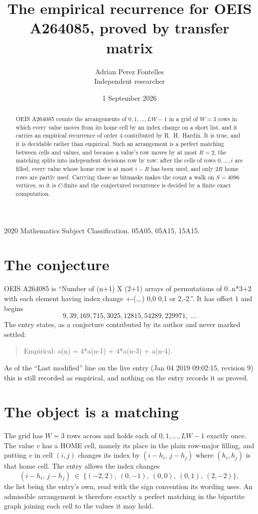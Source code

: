 \documentclass[11pt,a4paper]{article}
\title{The empirical recurrence for OEIS A264085, proved by transfer matrix}
\author{Adrian Perez Fontelles\\ \small Independent researcher}
\date{1 September 2026}
\theoremstyle{plain}
\theoremstyle{definition}
\begin{document}
\maketitle

\begin{abstract}
OEIS A264085 counts the arrangements of $0,1,\dots,LW-1$ in a grid of $W=3$ rows in which
every value moves from its home cell by an index change on a short list, and it carries an
empirical recurrence of order $4$ contributed by R.~H.~Hardin. It is true, and it is
decidable rather than empirical. Such an arrangement is a perfect matching between cells and
values, and because a value's row moves by at most $R=2$, the matching splits into
independent decisions row by row: after the cells of rows $0,\dots,i$ are filled,
every value whose home row is at most $i-R$ has been used, and only $2R$ home rows are
partly used. Carrying those as bitmasks makes the count a walk on $S=4096$ vertices, so it is
$C$-finite and the conjectured recurrence is decided by a finite exact computation.
\end{abstract}

\noindent\small 2020 Mathematics Subject Classification. 05A05, 05A15, 15A15.\normalsize

\section{The conjecture}

OEIS A264085 is ``Number of (n+1) X (2+1) arrays of permutations of 0..n*3+2 with each element having index change +-(.,.) 0,0 0,1 or 2,-2.''. It has offset $1$ and begins
\[
9, 39, 169, 715, 3025, 12815, 54289, 229971,\ \dots
\]
The entry states, as a conjecture contributed by its author and never marked settled:
\begin{quote}
Empirical: a(n) = 4*a(n-1) + 4*a(n-3) + a(n-4).
\end{quote}
As of the ``Last modified'' line on the live entry (Jan 04 2019 09:02:15, revision 9) this is still
recorded as empirical, and nothing on the entry records it as proved.

\section{The object is a matching}

The grid has $W=3$ rows across and holds each of $0,1,\dots,LW-1$ exactly once. The value
$v$ has a HOME cell, namely its place in the plain row-major filling, and putting $v$ in cell
$(i,j)$ changes its index by $(i-h_i,\,j-h_j)$ where $(h_i,h_j)$ is that home cell. The entry
allows the index changes
\[
(i-h_i,\,j-h_j)\;\in\;\{(-2,2),\ (0,-1),\ (0,0),\ (0,1),\ (2,-2)\},
\]
the list being the entry's own, read with the sign convention its wording uses. An admissible
arrangement is therefore exactly a perfect matching in the bipartite graph joining each cell to
the values it may hold.
\end{document}
